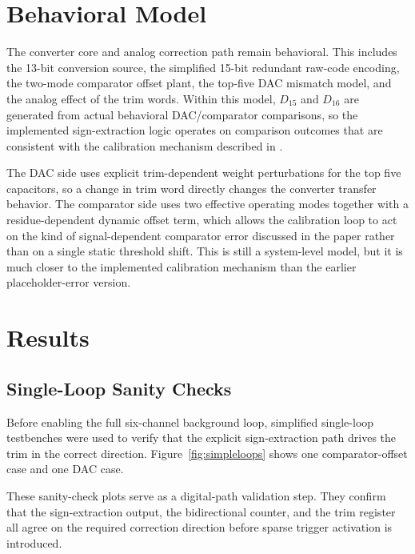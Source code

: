 \documentclass[11pt]{article}
\begin{document}
\section{Behavioral Model}
The converter core and analog correction path remain behavioral. This includes the 13-bit conversion source, the simplified 15-bit redundant raw-code encoding, the two-mode comparator offset plant, the top-five DAC mismatch model, and the analog effect of the trim words. Within this model, $D_{15}$ and $D_{16}$ are generated from actual behavioral DAC/comparator comparisons, so the implemented sign-extraction logic operates on comparison outcomes that are consistent with the calibration mechanism described in \cite{ding2017}.

The DAC side uses explicit trim-dependent weight perturbations for the top five capacitors, so a change in trim word directly changes the converter transfer behavior. The comparator side uses two effective operating modes together with a residue-dependent dynamic offset term, which allows the calibration loop to act on the kind of signal-dependent comparator error discussed in the paper \cite{ding2017} rather than on a single static threshold shift. This is still a system-level model, but it is much closer to the implemented calibration mechanism than the earlier placeholder-error version.

\section{Results}
\subsection{Single-Loop Sanity Checks}
Before enabling the full six-channel background loop, simplified single-loop testbenches were used to verify that the explicit sign-extraction path drives the trim in the correct direction. Figure~\ref{fig:simpleloops} shows one comparator-offset case and one DAC case.

These sanity-check plots serve as a digital-path validation step. They confirm that the sign-extraction output, the bidirectional counter, and the trim register all agree on the required correction direction before sparse trigger activation is introduced.
\end{document}
